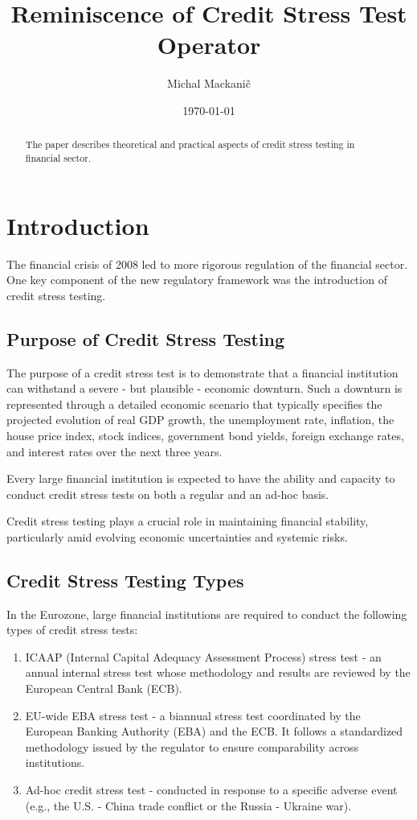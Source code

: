 \documentclass[11pt,a4paper]{article}
\title{Reminiscence of Credit Stress Test Operator}
\author{Michal Mackanič}
\date{\today}
\begin{document}
\maketitle

\begin{abstract}
The paper describes theoretical and practical aspects of credit stress testing in financial sector.
\end{abstract}

\tableofcontents{}

\section{Introduction}

The financial crisis of 2008 led to more rigorous regulation of the financial sector. One key component of the new regulatory framework was the introduction of credit stress testing.

\subsection{Purpose of Credit Stress Testing}
The purpose of a credit stress test is to demonstrate that a financial institution can withstand a severe - but plausible - economic downturn. Such a downturn is represented through a detailed economic scenario that typically specifies the projected evolution of real GDP growth, the unemployment rate, inflation, the house price index, stock indices, government bond yields, foreign exchange rates, and interest rates over the next three years.

Every large financial institution is expected to have the ability and capacity to conduct credit stress tests on both a regular and an ad-hoc basis.

Credit stress testing plays a crucial role in maintaining financial stability, particularly amid evolving economic uncertainties and systemic risks.

\subsection{Credit Stress Testing Types}
In the Eurozone, large financial institutions are required to conduct the following types of credit stress tests:
\begin{enumerate}
\item ICAAP (Internal Capital Adequacy Assessment Process) stress test - an annual internal stress test whose methodology and results are reviewed by the European Central Bank (ECB).
\item EU-wide EBA stress test - a biannual stress test coordinated by the European Banking Authority (EBA) and the ECB. It follows a standardized methodology issued by the regulator to ensure comparability across institutions.
\item Ad-hoc credit stress test - conducted in response to a specific adverse event (e.g., the U.S. - China trade conflict or the Russia - Ukraine war).
\end{enumerate}
\end{document}
